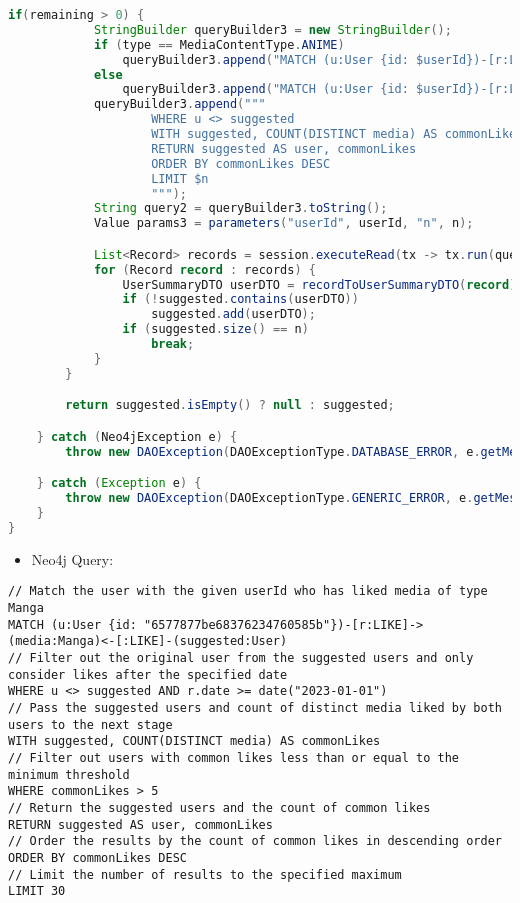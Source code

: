 \begin{mdframed}[style=customstyle]
\begin{lstlisting}[language=java]
        if(remaining > 0) {
            StringBuilder queryBuilder3 = new StringBuilder();
            if (type == MediaContentType.ANIME)
                queryBuilder3.append("MATCH (u:User {id: $userId})-[r:LIKE]->(media:Anime)<-[:LIKE]-(suggested:User) ");
            else
                queryBuilder3.append("MATCH (u:User {id: $userId})-[r:LIKE]->(media:Manga)<-[:LIKE]-(suggested:User) ");
            queryBuilder3.append("""
                    WHERE u <> suggested
                    WITH suggested, COUNT(DISTINCT media) AS commonLikes
                    RETURN suggested AS user, commonLikes
                    ORDER BY commonLikes DESC
                    LIMIT $n
                    """);
            String query2 = queryBuilder3.toString();
            Value params3 = parameters("userId", userId, "n", n);

            List<Record> records = session.executeRead(tx -> tx.run(query2, params3).list());
            for (Record record : records) {
                UserSummaryDTO userDTO = recordToUserSummaryDTO(record);
                if (!suggested.contains(userDTO))
                    suggested.add(userDTO);
                if (suggested.size() == n)
                    break;
            }
        }

        return suggested.isEmpty() ? null : suggested;

    } catch (Neo4jException e) {
        throw new DAOException(DAOExceptionType.DATABASE_ERROR, e.getMessage());

    } catch (Exception e) {
        throw new DAOException(DAOExceptionType.GENERIC_ERROR, e.getMessage());
    }
}
\end{lstlisting}
\end{mdframed}
    
\begin{itemize}
    \item Neo4j Query:
\end{itemize}

\begin{mdframed}[style=customstyle2]
\begin{lstlisting}[language=Cypher, backgroundcolor=\color{white}]
// Match the user with the given userId who has liked media of type Manga
MATCH (u:User {id: "6577877be68376234760585b"})-[r:LIKE]->(media:Manga)<-[:LIKE]-(suggested:User)
// Filter out the original user from the suggested users and only consider likes after the specified date
WHERE u <> suggested AND r.date >= date("2023-01-01")
// Pass the suggested users and count of distinct media liked by both users to the next stage
WITH suggested, COUNT(DISTINCT media) AS commonLikes
// Filter out users with common likes less than or equal to the minimum threshold
WHERE commonLikes > 5
// Return the suggested users and the count of common likes
RETURN suggested AS user, commonLikes
// Order the results by the count of common likes in descending order
ORDER BY commonLikes DESC
// Limit the number of results to the specified maximum
LIMIT 30\end{lstlisting}
\end{mdframed}

